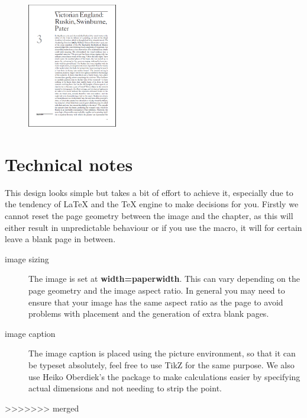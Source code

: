 \medskip

\begin{figure}[ht]
\centering
\includegraphics[width=0.35\textwidth]{./chapters/chapter16}
\end{figure}
\lipsum[2]


\section{Technical notes}

This design looks simple but takes a bit of effort to achieve it, especially due to the tendency of LaTeX and the TeX engine to make decisions for you. Firstly we cannot reset the page geometry between the image and the chapter, as this will either result in unpredictable behaviour or if you use the  macro, it will for certain leave a blank page in between.

\begin{description}
\item [image sizing] The image is set at \textbf{width=paperwidth}. This can vary depending on the page geometry and the image aspect ratio. In general you may need to ensure that your image has the same aspect ratio as the page to avoid problems with placement and the generation of extra blank pages.
\item [image caption] The image caption is placed using the picture environment, so that it can be typeset absolutely, feel free to use TikZ for the same purpose. We also use Heiko Oberdiek's the  package to make calculations easier by specifying actual dimensions and not needing to strip the point.
\end{description}


\restoregeometry

>>>>>>> merged

